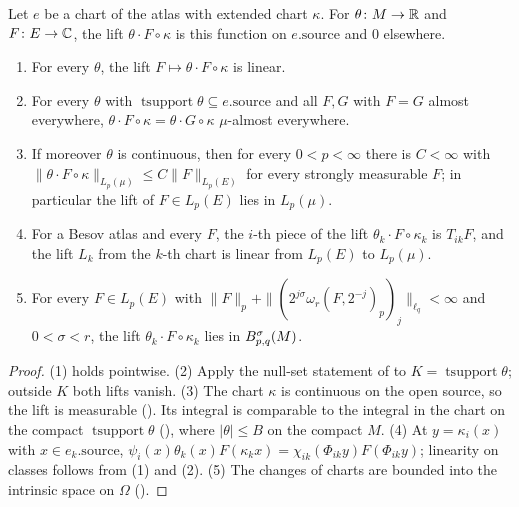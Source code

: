 \begin{lemma}
\label{lem:chart-lift}
\leanok
{}
Let $e$ be a chart of the atlas with extended chart $\kappa$. For $\theta \colon M \to \mathbb{R}$ and
$F \colon E \to \mathbb{C}$, the lift $\theta \cdot F \circ \kappa$ is this function on
$e.\mathrm{source}$ and $0$ elsewhere.
\begin{enumerate}
  \item For every $\theta$, the lift $F \mapsto \theta \cdot F \circ \kappa$ is linear.
  \item For every $\theta$ with $\operatorname{tsupport} \theta \subseteq e.\mathrm{source}$ and
    all $F, G$ with $F = G$ almost everywhere,
    $\theta \cdot F \circ \kappa = \theta \cdot G \circ \kappa$ $\mu$-almost everywhere.
  \item If moreover $\theta$ is continuous, then for every $0 < p < \infty$ there is $C < \infty$
    with $\|\theta \cdot F \circ \kappa\|_{L_p(\mu)} \leq C \|F\|_{L_p(E)}$ for every strongly
    measurable $F$; in particular the lift of $F \in L_p(E)$ lies in $L_p(\mu)$.
  \item For a Besov atlas and every $F$, the $i$-th piece of the lift
    $\theta_k \cdot F \circ \kappa_k$ is $T_{ik} F$, and the lift $L_k$ from the $k$-th chart is
    linear from $L_p(E)$ to $L_p(\mu)$.
  \item For every $F \in L_p(E)$ with
    $\|F\|_p + \|(2^{j\sigma} \omega_r(F, 2^{-j})_p)_j\|_{\ell_q} < \infty$ and $0 < \sigma < r$,
    the lift $\theta_k \cdot F \circ \kappa_k$ lies in $B^{\sigma}_{p,q}(M)$.
\end{enumerate}
\end{lemma}

\begin{proof}
\leanok
(1) holds pointwise. (2) Apply the null-set statement of  to
$K = \operatorname{tsupport} \theta$; outside $K$ both lifts vanish. (3) The chart $\kappa$ is
continuous on the open source, so the lift is measurable (). Its integral
is comparable to the integral in the chart on the compact $\operatorname{tsupport} \theta$
(), where $|\theta| \leq B$ on the compact $M$. (4) At $y = \kappa_i(x)$
with
$x \in e_k.\mathrm{source}$, $\psi_i(x) \theta_k(x) F(\kappa_k x) = \chi_{ik}(\Phi_{ik} y)
F(\Phi_{ik} y)$; linearity on classes follows from (1) and (2). (5) The changes of charts are
bounded into the intrinsic space on $\Omega$ ().
\end{proof}

